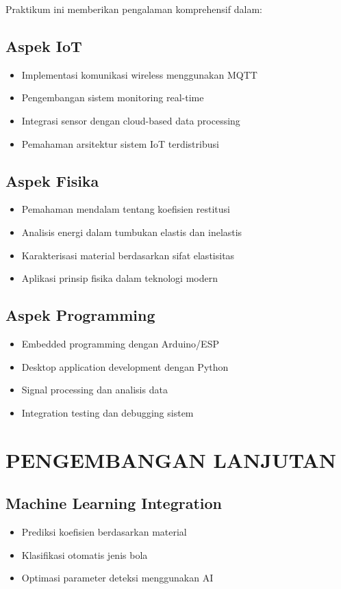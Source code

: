 \documentclass[12pt,a4paper]{article}
\begin{document}
Praktikum ini memberikan pengalaman komprehensif dalam:

\subsection{Aspek IoT}
\begin{itemize}
    \item Implementasi komunikasi wireless menggunakan MQTT
    \item Pengembangan sistem monitoring real-time
    \item Integrasi sensor dengan cloud-based data processing
    \item Pemahaman arsitektur sistem IoT terdistribusi
\end{itemize}

\subsection{Aspek Fisika}
\begin{itemize}
    \item Pemahaman mendalam tentang koefisien restitusi
    \item Analisis energi dalam tumbukan elastis dan inelastis
    \item Karakterisasi material berdasarkan sifat elastisitas
    \item Aplikasi prinsip fisika dalam teknologi modern
\end{itemize}

\subsection{Aspek Programming}
\begin{itemize}
    \item Embedded programming dengan Arduino/ESP
    \item Desktop application development dengan Python
    \item Signal processing dan analisis data
    \item Integration testing dan debugging sistem
\end{itemize}

\section{PENGEMBANGAN LANJUTAN}

\subsection{Machine Learning Integration}
\begin{itemize}
    \item Prediksi koefisien berdasarkan material
    \item Klasifikasi otomatis jenis bola
    \item Optimasi parameter deteksi menggunakan AI
\end{itemize}
\end{document}
